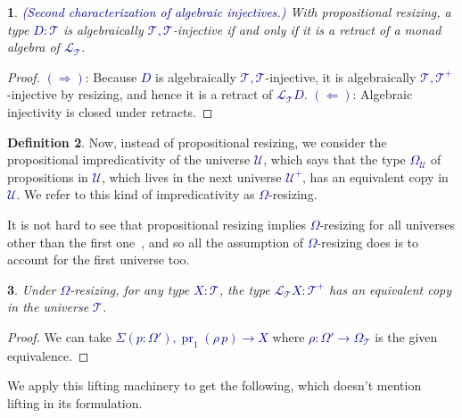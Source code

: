\documentclass[10pt]{article}
\newcommand{\db}{\textcolor{darkblue}}
\newcommand{\df}[1]{\emph{\db{#1}}}
\newcommand{\m}[1]{\db{$#1$}}
\newcommand{\fst}{\operatorname{pr}_1}
\newcommand{\U}{\mathcal{U}}
\newcommand{\T}{\mathcal{T}}
\newcommand{\Lift}{\mathcal{L}}
\newtheorem{numbered}{}
\theoremstyle{definition}
\newtheorem{definition}[numbered]{Definition}
\begin{document}
\begin{numbered} \df{(Second characterization of algebraic injectives.)}
  With propositional resizing, a type \m{D:\T} is algebraically
  \m{\T,\T}-injective if and only if it is a retract of a monad
  algebra of \m{\Lift_\T}.
\end{numbered}
\begin{proof}
  \m{(\Rightarrow)}: Because \m{D} is algebraically
  \m{\T,\T}-injective, it is algebraically \m{\T,\T^+}-injective by
  resizing, and hence it is a retract of \m{\Lift_\T D}.
%
  \m{(\Leftarrow)}: Algebraic injectivity is closed under retracts.
\end{proof}

\begin{definition} \label{omega:resizing}
Now, instead of propositional resizing, we consider the propositional
impredicativity of the universe \m{\U}, which says that the type
\m{\Omega_\U} of propositions in \m{\U}, which lives in the next
universe \m{\U^+}, has an equivalent copy in \m{\U}. We refer to this
kind of impredicativity as \m{\Omega}-resizing.
\end{definition}
It is not hard to see
that propositional resizing implies \m{\Omega}-resizing for all
universes other than the first one~\cite{TypeTopology}, and so all
the assumption of \m{\Omega}-resizing does is to account
for the first universe too.
%
\begin{numbered}
  Under \m{\Omega}-resizing, for any type \m{X:\T}, the type
  \m{\Lift_{\T} X : \T^+} has an equivalent copy in the universe \m{\T}.
\end{numbered}
\begin{proof}
  We can take \m{\Sigma (p : \Omega'), \fst(\rho \, p) \to X} where \m{\rho : \Omega' \to \Omega_\T} is the given equivalence.
\end{proof}

We apply this lifting machinery to get the following, which doesn't
mention lifting in its formulation.
\end{document}

